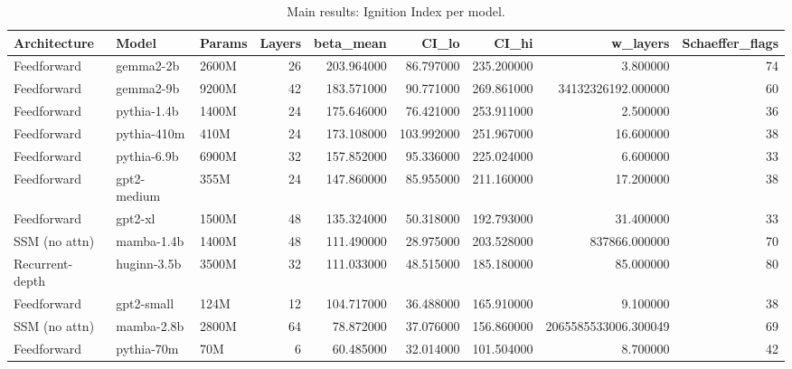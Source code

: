 \begin{table}
\caption{Main results: Ignition Index per model.}
\label{tab:results_main}
\begin{tabular}{lllrrrrrr}
\toprule
Architecture & Model & Params & Layers & beta_mean & CI_lo & CI_hi & w_layers & Schaeffer_flags \\
\midrule
Feedforward & gemma2-2b & 2600M & 26 & 203.964000 & 86.797000 & 235.200000 & 3.800000 & 74 \\
Feedforward & gemma2-9b & 9200M & 42 & 183.571000 & 90.771000 & 269.861000 & 34132326192.000000 & 60 \\
Feedforward & pythia-1.4b & 1400M & 24 & 175.646000 & 76.421000 & 253.911000 & 2.500000 & 36 \\
Feedforward & pythia-410m & 410M & 24 & 173.108000 & 103.992000 & 251.967000 & 16.600000 & 38 \\
Feedforward & pythia-6.9b & 6900M & 32 & 157.852000 & 95.336000 & 225.024000 & 6.600000 & 33 \\
Feedforward & gpt2-medium & 355M & 24 & 147.860000 & 85.955000 & 211.160000 & 17.200000 & 38 \\
Feedforward & gpt2-xl & 1500M & 48 & 135.324000 & 50.318000 & 192.793000 & 31.400000 & 33 \\
SSM (no attn) & mamba-1.4b & 1400M & 48 & 111.490000 & 28.975000 & 203.528000 & 837866.000000 & 70 \\
Recurrent-depth & huginn-3.5b & 3500M & 32 & 111.033000 & 48.515000 & 185.180000 & 85.000000 & 80 \\
Feedforward & gpt2-small & 124M & 12 & 104.717000 & 36.488000 & 165.910000 & 9.100000 & 38 \\
SSM (no attn) & mamba-2.8b & 2800M & 64 & 78.872000 & 37.076000 & 156.860000 & 2065585533006.300049 & 69 \\
Feedforward & pythia-70m & 70M & 6 & 60.485000 & 32.014000 & 101.504000 & 8.700000 & 42 \\
\bottomrule
\end{tabular}
\end{table}
